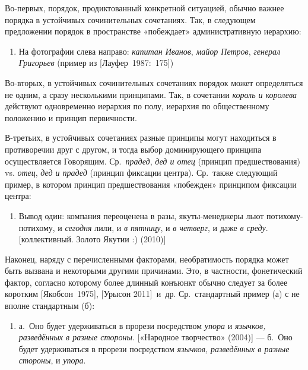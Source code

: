 Во-первых, порядок, продиктованный конкретной ситуацией, обычно важнее
порядка в устойчивых сочинительных сочетаниях. Так, в следующем
предложении порядок в пространстве «побеждает» административную
иерархию:

\begin{enumerate}
  \def\labelenumi{(\arabic{enumi})}
  \setcounter{enumi}{27}
  \item
        На фотографии слева направо: \textit{капитан Иванов}, \textit{майор
          Петров}, \textit{генерал Григорьев} (пример из {[}Лауфер~1987:~175{]})
\end{enumerate}

Во-вторых, в устойчивых сочинительных сочетаниях порядок может
определяться не одним, а сразу несколькими принципами. Так, в сочетании
\textit{король и королева} действуют одновременно иерархия по полу,
иерархия по общественному положению и принцип первичности.

В-третьих, в устойчивых сочетаниях разные принципы могут находиться в
противоречии друг с другом, и тогда выбор доминирующего принципа
осуществляется Говорящим. Ср.~\textit{прадед}, \textit{дед и отец} (принцип
предшествования) vs. \textit{отец}, \textit{дед и прадед} (принцип фиксации
центра). Ср.~также следующий пример, в котором принцип предшествования
«побежден» принципом фиксации центра:

\begin{enumerate}
  \def\labelenumi{(\arabic{enumi})}
  \setcounter{enumi}{28}
  \item
        Вывод один: компания переоценена в разы, якуты-менеджеры льют
        потихому-потихому, и \textit{сегодня} лили, и \textit{в пятницу}, и
        \textit{в четверг}, и даже \textit{в среду}. {[}коллективный. Золото
        Якутии :) (2010){]}
\end{enumerate}

Наконец, наряду с перечисленными факторами, необратимость порядка может
быть вызвана и некоторыми другими причинами. Это, в частности,
фонетический фактор, согласно которому более длинный конъюнкт обычно
следует за более коротким {[}Якобсон~1975{]}, {[}Урысон 2011{]}~и~др.
Ср.~стандартный пример (а) с не вполне стандартным (б):

\begin{enumerate}
  \def\labelenumi{(\arabic{enumi})}
  \setcounter{enumi}{29}
  \item
        а.~Оно будет удерживаться в прорези посредством \textit{упора} и
        \textit{язычков, разведённых в разные стороны}. {[}«Народное творчество»
        (2004){]} --- б.~Оно будет удерживаться в прорези посредством
        \textit{язычков, разведённых в разные стороны}, и \textit{упора}.
\end{enumerate}

